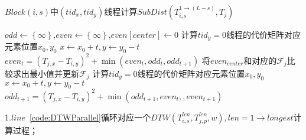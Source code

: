 \begin{breakablealgorithm}
	\caption{$Block(i,s)$中$(tid_x,tid_y)$线程计算$SubDist(T_{i,s}^{1\to (L-s)},T_j)$}
	\label{alg:kernel_ComputedtwsperblockForAll}
	\begin{algorithmic}[1]
			 \label{code:DTWCoalesced}
					\State $odd \gets \left\lbrace \infty\right\rbrace$,$even \gets \left\lbrace \infty\right\rbrace$,$even[center] \gets 0$
					 \label{code:DTWParallel}
						\State 计算$tid_y=0$线程的代价矩阵对应元素位置$x_0,y_0$
						 \label{code:dtwparallelequst}
							\State $x \gets x_0 + t, y \gets y_0 - t$
							 \label{code:prunedtwZone}
								\State $even_t = (T_{j,x}-T_{i,y})^2 +\min(even_t,odd_t,odd_{t+1})$
							\EndIf
						\EndFor
						\State 将$even_{center}$和对应的$\mathcal{F}_j$比较求出最小值并更新$\mathcal{F}_j$ \label{code:dtwcompare0toL}
						\State 计算$tid_y=0$线程的代价矩阵对应元素位置$x_0,y_0$
							\State $x \gets x_0 + t, y \gets y_0 - t$
								\State $odd_{t+1}=(T_{j,x}-T_{i,y})^2 +\min(odd_{t+1},even_t,,even_{t+1})$
							\EndIf
						\EndFor  \label{code:dtwparallelequed}
					\EndFor
				\EndFor
			\EndFor
		\EndFunction
	\end{algorithmic}
\end{breakablealgorithm}

1.$line$~\ref{code:DTWParallel}循环对应一个$DTW(T_{i,s}^{len},T_{j,p}^{len},w),len=1\to longest$计算过程；

